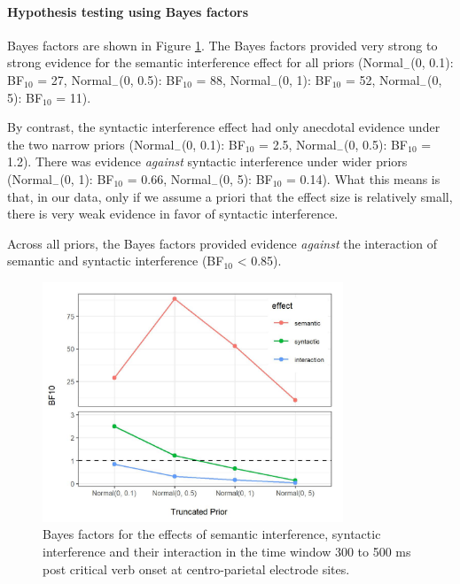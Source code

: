 \documentclass[a4paper, man, floatsintext]{apa7}
\begin{document}
\paragraph{Hypothesis testing using Bayes factors}

Bayes factors are shown in Figure \ref{fig:eeg_bfs}. The Bayes factors provided very strong to strong evidence for the semantic interference effect for all priors 
(Normal$_{-}$(0, 0.1): BF$_{10}$ = 27,
Normal$_{-}$(0, 0.5): BF$_{10}$ = 88,
Normal$_{-}$(0, 1): BF$_{10}$ = 52,
Normal$_{-}$(0, 5): BF$_{10}$ = 11). 

By contrast, the syntactic interference effect had only anecdotal evidence  under the two narrow priors (Normal$_{-}$(0, 0.1): BF$_{10}$ = 2.5,
Normal$_{-}$(0, 0.5): BF$_{10}$ = 1.2). There was evidence \textit{against} syntactic interference under wider priors 
(Normal$_{-}$(0, 1): BF$_{10}$ = 0.66,
Normal$_{-}$(0, 5): BF$_{10}$ = 0.14).  What this means is that, in our data, only if we assume a priori that the effect size is relatively small, there is very weak evidence in favor of syntactic interference.

Across all priors, the Bayes factors provided evidence \textit{against} the interaction of semantic and syntactic interference (BF$_{10}$ < 0.85).

\begin{figure}[H]
    \caption{Bayes factors for the effects of semantic interference, syntactic interference and their interaction in the time window 300 to 500 ms post critical verb onset at centro-parietal electrode sites.}
    \label{fig:eeg_bfs}
    \centering
    \includegraphics[width=0.8\textwidth]{images/BF_plot_N103_cp_300_500.jpg}
\end{figure}
\end{document}
